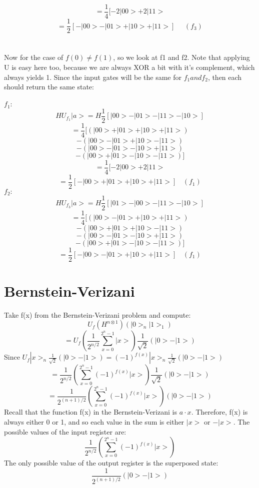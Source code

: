 \documentclass[12pt]{article}
\begin{document}
$$ = \frac{1}{4}[-2|00> + 2|11>$$
\[
\boxed{ = \frac{1}{2}[-|00> - |01> + |10> + |11>] 	\>\>\>\>\>\>(f_{3})}
\]
\\\\
Now for the case of $f(0) \neq f(1)$, so we look at f1 and f2. Note that applying U is easy here too, because we are always XOR a bit with it's complement, which always yields 1. Since the input gates will be the same for $f_{1} and f_{2}$, then each should return the same state:
\\\\
$f_{1}:$
$$ HU_{f_1}|a> = H \frac{1}{2}[|00> - |01> - |11> - |10>]  $$
$$ = \frac{1}{4}[ (|00> + |01> + |10> + |11>)
$$$$ -  (|00> - |01> + |10> - |11>)
$$$$- (|00> - |01> - |10> + |11>)
$$$$ - (|00> + |01> - |10> - |11>)]$$
$$ = \frac{1}{4}[-2|00> + 2|11>$$
\[
\boxed{ = \frac{1}{2}[-|00> + |01> + |10> + |11>] \>\>\>\> (f_{1}) }
\]
$f_{2}:$
$$ HU_{f_3} |a> = H \frac{1}{2}[|01> - |00> - |11> - |10>]$$
$$ = \frac{1}{4}[ (|00> - |01> + |10> + |11>)
$$$$ -  (|00> + |01> + |10> - |11>)
$$$$- (|00> - |01> - |10> + |11>)
$$$$ - (|00> + |01> - |10> - |11>)]$$
\[
\boxed{ = \frac{1}{2}[-|00> - |01> + |10> + |11>] \>\>\>\> (f_{1}) }
\]

\section{Bernstein-Verizani}

Take f(x) from the Bernstein-Verizani problem and compute:
$$U_{f}(H^{n \otimes 1})(|0>_{n}|1>_{1})$$
$$ = U_{f} (\frac{1}{2^{n/2}}\displaystyle\sum\limits_{x=0}^{2^{n} - 1} |x>) \frac{1}{\sqrt{2}}(|0> - |1>)$$
Since $ U_{f}|x>_{n} \frac{1}{\sqrt{2}}(|0>-|1>) = (-1)^{f(x)}|x>_{n} \frac{1}{\sqrt{2}}(|0> - |1>) $
$$ = \frac{1}{2^{n/2}} (\displaystyle\sum\limits_{x=0}^{2^{n} - 1} (-1)^{f(x)}|x>) \frac{1}{\sqrt{2}}(|0> - |1>) $$
\[
\boxed{ = \frac{1}{2^{(n+1)/2}} (\displaystyle\sum\limits_{x=0}^{2^{n} - 1} (-1)^{f(x)}|x>)(|0> - |1>)}
\]
Recall that the function f(x) in the Bernstein-Verizani is $ a \cdot x$. Therefore, f(x) is always either 0 or 1, and so each value in the sum is either $|x>$ or $-|x>$.
The possible values of the input register are:
\[
\boxed{\frac{1}{2^{n/2}} (\displaystyle\sum\limits_{x=0}^{2^{n} - 1} (-1)^{f(x)}|x>)}
\]
The only possible value of the output register is the superposed state:
\[
\boxed{ \frac{1}{2^{(n+1)/2}}(|0> - |1>)}
\]
\end{document}
